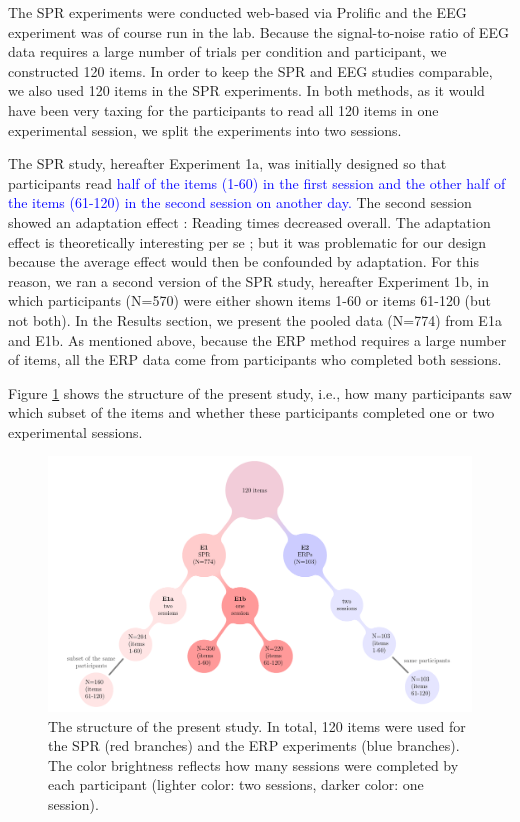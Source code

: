 \documentclass[review,preprint,12pt,authoryear,floatsintext]{elsarticle}
\begin{document}
The SPR experiments were conducted web-based via Prolific and the EEG experiment was of course run in the lab.  Because the signal-to-noise ratio of EEG data requires a large number of trials per condition and participant, we constructed 120 items. In order to keep the SPR and EEG studies comparable, we also used 120 items in the SPR experiments. In both methods, as it would have been very taxing for the participants to read all 120 items in one experimental session, we split the experiments into two sessions. 

The SPR study, hereafter Experiment 1a, was initially designed so that participants read \textcolor{blue}{half of the items (1-60) in the first session and the other half of the items (61-120) in the second session on another day.} The second session showed an adaptation effect \citep{prasad2021rapid}: Reading times decreased overall. The adaptation effect is theoretically interesting per se \citep{fine2013rapid}; but it was problematic for our design because the average effect would then be confounded by adaptation. For this reason, we ran a second version of the SPR study, hereafter Experiment 1b, in which participants (N=570) were either shown items 1-60 or items 61-120 (but not both). In the Results section, we present the pooled data (N=774) from E1a and E1b.
As mentioned above, because the ERP method requires a large number of items, all the ERP data come from participants who completed both sessions. 

Figure \ref{fig:project_str} shows the structure of the present study, i.e., how many participants saw which subset of the items and whether these participants completed one or two experimental sessions.

\begin{figure}[ht]
    \caption{The structure of the present study. In total, 120 items were used for the SPR (red branches) and the ERP experiments (blue branches). The color brightness reflects how many sessions were completed by each participant (lighter color: two sessions, darker color: one session).}
    \label{fig:project_str}
    \centering
    \includegraphics[width=\textwidth]{pandora_project_structure_figure.pdf}
\end{figure}
\end{document}
